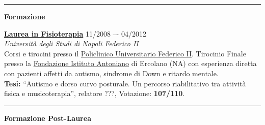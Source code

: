 \documentclass[a4paper]{article}
\newcommand{\block}[1]{\hrule \vspace{0.2cm} \textbf{\Large #1} \vspace{0.2cm}}
\newcommand{\voice}[5]{\href{#4}{\textbf{#1}} \hfill #2 \\ \textit{#3} \\ {\small #5} \vspace{0.2cm} \\}
\begin{document}

    \block{Formazione}

    \voice{Laurea in Fisioterapia}
    {11/2008 –- 04/2012}
    {Università degli Studi di Napoli Federico II%
    }
    {https://m78.corsidistudio.unina.it/}
    {
    Corsi e tirocini presso il \href{https://www.policlinico.unina.it/flex/cm/pages/ServeBLOB.php/L/IT/IDPagina/1}{Policlinico Universitario Federico II}.
    Tirocinio Finale presso la \href{https://www.istitutoantoniano.it/}{Fondazione Istituto Antoniano} di Ercolano (NA) con esperienza diretta con pazienti affetti da autismo, sindrome di Down e ritardo mentale.\\
    \textbf{Tesi:} “Autismo e dorso curvo posturale. Un percorso riabilitativo tra attività fisica e musicoterapia”, relatore ???, Votazione: \textbf{107/110}.
    \vspace{-0.25cm}
    }

    \block{Formazione Post-Laurea}
\end{document}
